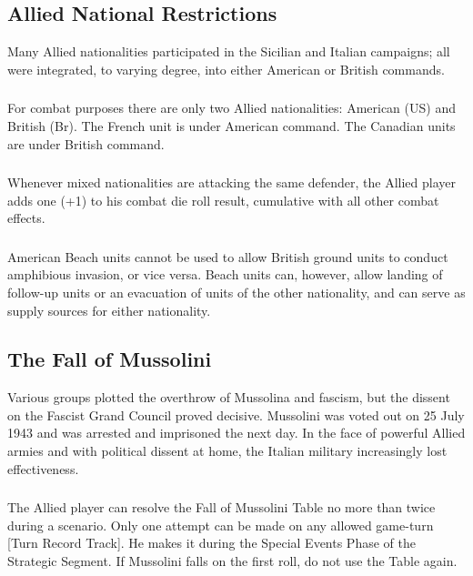\subsection{Allied National Restrictions}

Many Allied nationalities participated in the Sicilian and Italian campaigns; all were integrated, to varying degree, into either American or British commands.

\subsubsection{} For combat purposes there are only two Allied nationalities: American (US) and British (Br). The French unit is under American command. The Canadian units are under British command.

\subsubsection{} Whenever mixed nationalities are attacking the same defender, the Allied player adds one (+1) to his combat die roll result, cumulative with all other combat effects.

\subsubsection{} American Beach units cannot be used to allow British ground units to conduct amphibious invasion, or vice versa. Beach units can, however, allow landing of follow-up units or an evacuation of units of the other nationality, and can serve as supply sources for either nationality.

\subsection{The Fall of Mussolini}

Various groups plotted the overthrow of Mussolina and fascism, but the dissent on the Fascist Grand Council proved decisive. Mussolini was voted out on 25 July 1943 and was arrested and imprisoned the next day. In the face of powerful Allied armies and with political dissent at home, the Italian military increasingly lost effectiveness.

\subsubsection{}The Allied player can resolve the Fall of Mussolini Table no more than twice during a scenario. Only one attempt can be made on any allowed game-turn [Turn Record Track]. He makes it during the Special Events Phase of the Strategic Segment. If Mussolini falls on the first roll, do not use the Table again.

